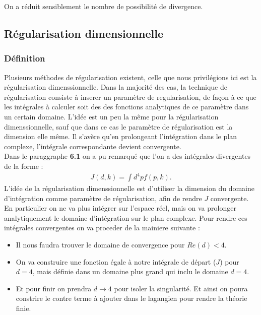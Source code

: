 \documentclass[a4paper,11pt]{article} %
\theoremstyle{plain}
\theoremstyle{definition}
\theoremstyle{remark}
\numberwithin{equation}{section}
\numberwithin{equation}{subsection}
\numberwithin{figure}{section}
\begin{document}
\noindent
On a réduit sensiblement le nombre de possibilité de divergence. 

  \subsection{Régularisation dimensionnelle}

    \subsubsection{Définition}

\noindent
Plusieurs méthodes de régularisation existent, celle que nous privilégions ici est la régularisation dimenssionnelle. Dans la majorité 
des cas, la technique de régularisation consiste à inserer un paramètre de regularisation, de façon à ce que les intégrales à calculer 
soit des des fonctions analytiques de ce paramètre dans un certain domaine. L'idée est un peu la même pour la régularisation dimenssionnelle, 
sauf que dans ce cas le paramètre de régularisation est la dimension elle même. Il s'avère qu'en prolongeant l'intégration dans le plan 
complexe, l'intégrale correspondante devient convergente.\\
Dans le paraggraphe \textbf{6.1} on a pu remarqué que l'on a des intégrales divergentes de la forme :
\begin{eqnarray*}
 J(d,k) = \int d^{4}p f(p,k).
\end{eqnarray*}
L'idée de la régularisation dimenssionnelle est d'utiliser la dimension du domaine d'intégration comme paramètre de régularisation, 
afin de rendre $J$ convergente. En particulier on ne va plus intégrer sur l'espace réel, mais on va prolonger analytiquement le domaine 
d'intégration sur le plan complexe. Pour rendre ces intégrales convergentes on va proceder de la mainiere suivante :
\begin{itemize}
 \item Il nous faudra trouver le domaine de convergence pour $Re(d)<4$.
 \item On va construire une fonction égale à notre intégrale de départ ($J$) pour $d=4$, mais définie dans un domaine plus grand qui 
inclu le domaine $d=4$.
 \item Et pour finir on prendra $d \rightarrow 4$ pour isoler la singularité. Et ainsi on poura constrire le contre terme à ajouter dans le 
lagangien pour rendre la théorie finie.
\end{itemize}
\end{document}
